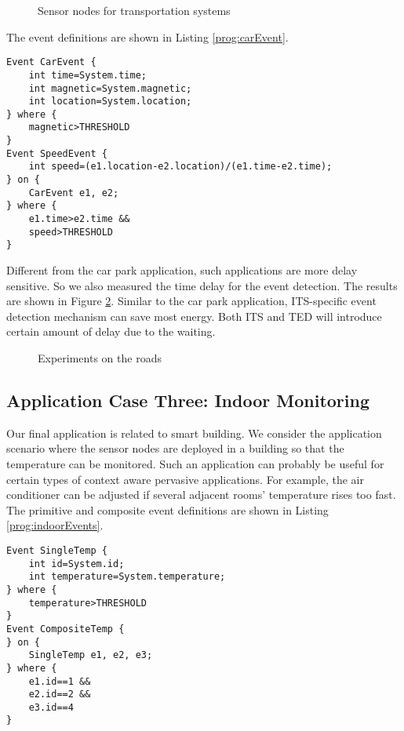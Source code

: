 \begin{figure}
\centering
{}
\caption{Sensor nodes for transportation systems}
\label{fig:itsSensor}
\end{figure}

The event definitions are shown in Listing \ref{prog:carEvent}.

\begin{lstlisting}[caption=Event definition for tracking vehicles, label=prog:carEvent]
Event CarEvent {
	int time=System.time;
	int magnetic=System.magnetic;
	int location=System.location;
} where {
	magnetic>THRESHOLD
}
Event SpeedEvent {
	int speed=(e1.location-e2.location)/(e1.time-e2.time);
} on {
	CarEvent e1, e2;
} where {
	e1.time>e2.time &&
	speed>THRESHOLD
}
\end{lstlisting}

Different from the car park application, such applications are more delay sensitive. So we also measured the time delay for the event detection. The results are shown in Figure \ref{fig:itsResults}. Similar to the car park application, ITS-specific event detection mechanism can save most energy. Both ITS and TED will introduce certain amount of delay due to the waiting.
 
\begin{figure}
\centering
{}
\qquad
{}
\caption{Experiments on the roads}
\label{fig:itsResults}
\end{figure}

\subsection{Application Case Three: Indoor Monitoring}
Our final application is related to smart building. We consider the application scenario where the sensor nodes are deployed in a building so that the temperature can be monitored. Such an application can probably be useful for certain types of context aware pervasive applications. For example, the air conditioner can be adjusted if several adjacent rooms' temperature rises too fast. The primitive and composite event definitions are shown in Listing \ref{prog:indoorEvents}.

\begin{lstlisting}[caption=Event definition for indoor monitoring, label=prog:indoorEvents]
Event SingleTemp {
	int id=System.id;
	int temperature=System.temperature;
} where {
	temperature>THRESHOLD
}
Event CompositeTemp {
} on {
	SingleTemp e1, e2, e3;
} where {
	e1.id==1 &&
	e2.id==2 &&
	e3.id==4
}
\end{lstlisting}

